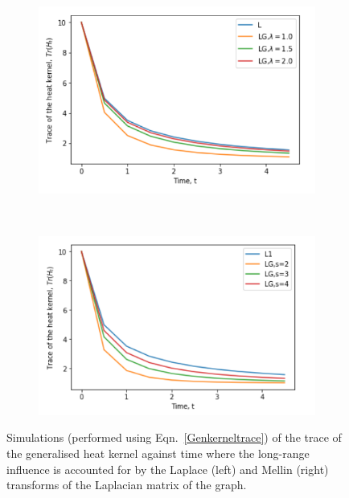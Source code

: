 \documentclass[10pt,a4paper]{article}
\begin{document}
        \begin{figure}[H]
        	\centering
        	\begin{subfigure}[b]{0.45\textwidth}
        		\includegraphics[width= \textwidth]{images/Laplace-heattrace.png}
        		\caption{}
        		\label{model1-mellin}
        	\end{subfigure}~
        	\begin{subfigure}[b]{0.45\textwidth}
        		\includegraphics[width= \textwidth]{images/model-2-mellin.png}
        		\caption{}
        		\label{model2-mellin}
        	\end{subfigure} 
        	\caption{Simulations (performed using Eqn.~\ref{Genkerneltrace}) of the trace of the generalised heat kernel against time where the long-range influence is accounted for by the Laplace (left) and Mellin (right) transforms of the Laplacian matrix of the graph.}
        	\label{toy-Mellin-Laplce-simulations}
        \end{figure}
            
\end{document}
